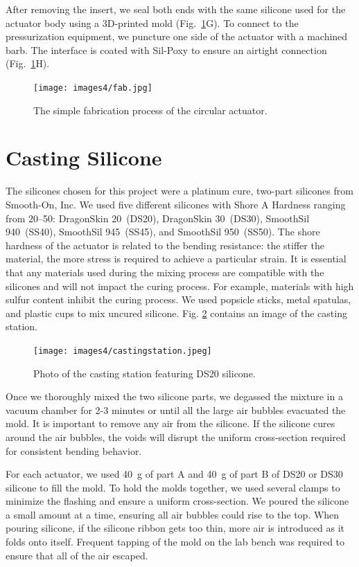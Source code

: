 After removing the insert, we seal both ends with the same silicone used for the actuator body using a 3D-printed mold (Fig.~\ref{figure:fab}G). To connect to the pressurization equipment, we puncture one side of the actuator with a machined barb. The interface is coated with Sil-Poxy to ensure an airtight connection (Fig.~\ref{figure:fab}H).

\begin{figure}[ht!]
    \centering
     \texttt{[image: images4/fab.jpg]}
    \caption{The simple fabrication process of the circular actuator.}
    \label{figure:fab}
\end{figure}

\clearpage
\section{Casting Silicone}

The silicones chosen for this project were a platinum cure, two-part silicones from Smooth-On, Inc. We used five different silicones with Shore A Hardness ranging from 20--50: DragonSkin 20~(DS20), DragonSkin 30~(DS30), SmoothSil 940~(SS40), SmoothSil 945~(SS45), and SmoothSil 950~(SS50). The shore hardness of the actuator is related to the bending resistance: the stiffer the material, the more stress is required to achieve a particular strain. It is essential that any materials used during the mixing process are compatible with the silicones and will not impact the curing process. For example, materials with high sulfur content inhibit the curing process. We used popsicle sticks, metal spatulas, and plastic cups to mix uncured silicone. Fig. \ref{fig:castingstation} contains an image of the casting station. 

\begin{figure}[ht]
    \centering
    \texttt{[image: images4/castingstation.jpeg]}
    \caption{Photo of the casting station featuring DS20 silicone.}
    \label{fig:castingstation}
\end{figure}

Once we thoroughly mixed the two silicone parts, we degassed the mixture in a vacuum chamber for 2-3 minutes or until all the large air bubbles evacuated the mold. It is important to remove any air from the silicone. If the silicone cures around the air bubbles, the voids will disrupt the uniform cross-section required for consistent bending behavior. 

For each actuator, we used 40~g of part A and 40~g of part B of DS20 or DS30  silicone to fill the mold. To hold the molds together, we used several clamps to minimize the flashing and ensure a uniform cross-section. We poured the silicone a small amount at a time, ensuring all air bubbles could rise to the top. When pouring silicone, if the silicone ribbon gets too thin, more air is introduced as it folds onto itself. Frequent tapping of the mold on the lab bench was required to ensure that all of the air escaped. 

